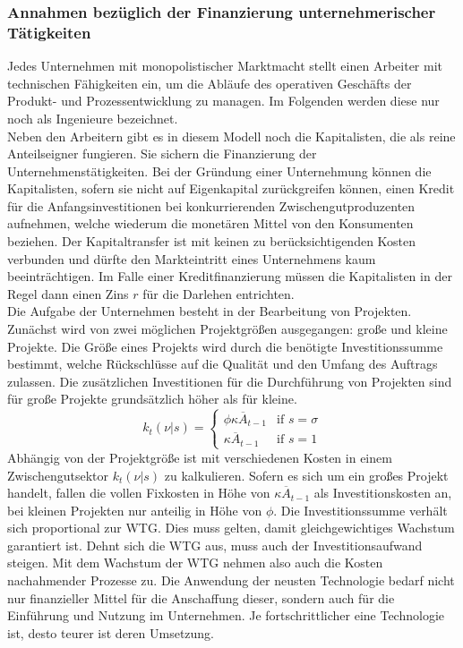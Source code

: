 \subsubsection{Annahmen bezüglich der Finanzierung unternehmerischer Tätigkeiten}
Jedes Unternehmen mit monopolistischer Marktmacht stellt einen Arbeiter mit technischen Fähigkeiten ein, um die Abläufe des operativen Geschäfts der Produkt- und Prozessentwicklung zu managen. Im Folgenden werden diese nur noch als Ingenieure bezeichnet. \\
%
Neben den Arbeitern gibt es in diesem Modell noch die Kapitalisten, die als reine Anteilseigner fungieren. Sie sichern die Finanzierung der Unternehmenstätigkeiten. Bei der Gründung einer Unternehmung können die Kapitalisten, sofern sie nicht auf Eigenkapital zurückgreifen können, einen Kredit für die Anfangsinvestitionen bei konkurrierenden Zwischengutproduzenten aufnehmen, welche wiederum die monetären Mittel von den Konsumenten beziehen. Der Kapitaltransfer ist mit keinen zu berücksichtigenden Kosten verbunden und dürfte den Markteintritt eines Unternehmens kaum beeinträchtigen. Im Falle einer Kreditfinanzierung müssen die Kapitalisten in der Regel dann einen Zins $r$ für die Darlehen entrichten.\\
%
Die Aufgabe der Unternehmen besteht in der Bearbeitung von Projekten.
Zunächst wird von zwei möglichen Projektgrößen ausgegangen: große und kleine Projekte. Die Größe eines Projekts wird durch die benötigte Investitionssumme bestimmt, welche Rückschlüsse auf die Qualität und den Umfang des Auftrags zulassen. Die zusätzlichen Investitionen für die Durchführung von Projekten sind für große Projekte grundsätzlich höher als für kleine.
%
	\begin{equation}
		k_t(\nu|s)=\begin{cases}\phi\kappa\overline{A}_{t-1}& \text{if } s= \sigma\\
		\kappa\overline{A}_{t-1}
		& \text {if }  s=1\end{cases}
	\end{equation}
%
Abhängig von der Projektgröße ist mit verschiedenen Kosten in einem Zwischengutsektor $k_t(\nu|s)$ zu kalkulieren. Sofern es sich um ein großes Projekt handelt, fallen die vollen Fixkosten in Höhe von $\kappa\overline{A}_{t-1}$ als Investitionskosten an, bei kleinen Projekten nur anteilig in Höhe von $\phi$. Die Investitionssumme verhält sich proportional zur WTG. Dies muss gelten, damit gleichgewichtiges Wachstum garantiert ist. Dehnt sich die WTG aus, muss auch der Investitionsaufwand steigen. Mit dem Wachstum der WTG nehmen also auch die Kosten nachahmender Prozesse zu. Die Anwendung der neusten Technologie bedarf nicht nur finanzieller Mittel für die Anschaffung dieser, sondern auch für die Einführung und Nutzung im Unternehmen. Je fortschrittlicher eine Technologie ist, desto teurer ist deren Umsetzung.
%
